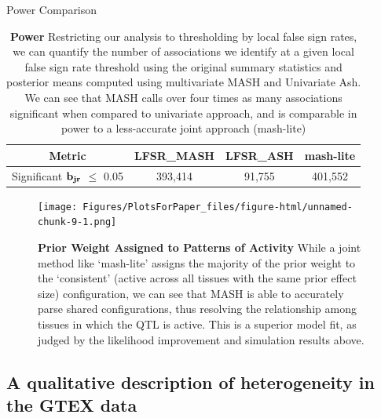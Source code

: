 \begin{table}[ht]
\caption{Power Comparison}
\centering
\begin{tabular}{c c c c}
\hline\hline
Metric & LFSR_{MASH} & LFSR_{ASH}&mash-lite \\ [0.5ex] %
\hline
Significant $\bf{b}_{jr}$ $\leq$ 0.05%
&393,414 & 91,755&401,552\\
\hline
\end{tabular}
\caption{\textbf{Power} Restricting our analysis to thresholding by local false sign rates, we can quantify the number of associations we identify at a given local false sign rate threshold using the original summary statistics and posterior means computed using multivariate MASH and Univariate Ash. We can see that MASH calls over four times as many associations significant when compared to univariate approach, and is comparable in power to a less-accurate joint approach (mash-lite)}
\label{table:power}
\end{table}\newline



\begin{figure}[htbp]
\texttt{[image: Figures/PlotsForPaper\_files/figure-html/unnamed-chunk-9-1.png]}
\caption{\textbf{Prior Weight Assigned to Patterns of Activity} While a joint method like `mash-lite' assigns the majority of the prior weight to the `consistent' (active across all tissues with the same prior effect size) configuration, we can see that MASH is able to accurately parse shared configurations, thus resolving the relationship among tissues in which the QTL is active. This is a superior model fit, as judged by the likelihood improvement and simulation results above.}
\label{fig:pihat}
\end{figure}\newline





\subsection{A qualitative description of heterogeneity in the GTEX data}

